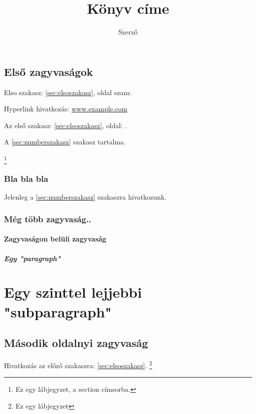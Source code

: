\documentclass[12pt]{book}
\begin{document}
\title{Könyv címe}
\author{Szerző}
\maketitle

\tableofcontents
\newpage

\section[zagyvaság]{Első zagyvaságok}
Elso szakasz: \ref{sec:elsoszakasz}, oldal szam: \pageref{sec:elsoszakasz}
\label{sec:elsoszakasz}

Hyperlink hivatkozás:
\href{https://www.example.com}{www.example.com}

Az első szakasz: \autoref{sec:elsoszakasz}, oldal: .

A \ref{sec:numberszakasz} szakasz tartalma.

\footnote{Ez egy lábjegyzet, a section címsorba.}
\subsection{Bla bla bla}
Jelenleg a \cref{sec:numberszakasz} szakaszra hivatkozunk. \\
\label{sub:alszakasz1}
\hulipsum[2]  %
\subsection{Még több zagyvaság..}
\label{sub:alszakasz2}
\hulipsum[2]
\subsubsection{Zagyvaságon belüli zagyvaság}
\label{sub:alszakasz3}
\paragraph{Egy "paragraph"}
\chapter{Egy szinttel lejjebbi "subparagraph"}
\section{Második oldalnyi zagyvaság}
Hivatkozás az előző szakaszra: \vref{sec:elsoszakasz}.
\hulipsum[2-3] \linebreak
\footnote{Ez egy lábjegyzet}
\end{document}
